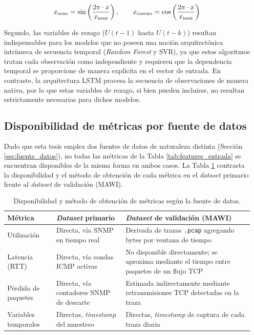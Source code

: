 \documentclass[12pt]{report}
\begin{document}
\begin{equation}
    x_{\mbox{\scriptsize seno}} = \sin\left(\frac{2\pi \cdot x}{x_{\max}}\right), \qquad x_{\mbox{\scriptsize coseno}} = \cos\left(\frac{2\pi \cdot x}{x_{\max}}\right)
    \label{eq:codificacion_ciclica}
\end{equation}

Segundo, las variables de rezago ($U(t-1)$ hasta $U(t-k)$) resultan indispensables para los modelos que no poseen una noción arquitectónica intrínseca de secuencia temporal (\textit{Random Forest} y SVR), ya que estos algoritmos tratan cada observación como independiente y requieren que la dependencia temporal se proporcione de manera explícita en el vector de entrada. En contraste, la arquitectura LSTM procesa la secuencia de observaciones de manera nativa, por lo que estas variables de rezago, si bien pueden incluirse, no resultan estrictamente 
necesarias para dichos modelos.

\subsection*{Disponibilidad de métricas por fuente de datos}

Dado que esta tesis emplea dos fuentes de datos de naturaleza distinta (Sección \ref{sec:fuente_datos}), no todas las métricas de la Tabla \ref{tab:features_entrada} se encuentran disponibles de la misma forma en ambos casos. La Tabla \ref{tab:disponibilidad_metricas} contrasta la disponibilidad y el método de obtención de cada métrica en el \textit{dataset} primario frente al \textit{dataset} de validación (MAWI).

\begin{table}[H]
    \centering
    \begin{tabular}{|l|p{4.5cm}|p{4.5cm}|}
        \hline
        \textbf{Métrica} & \textbf{\textit{Dataset} primario} & \textbf{\textit{Dataset} de validación (MAWI)} \\
        \hline
        Utilización & Directa, vía SNMP en tiempo real & Derivada de trazas \texttt{.pcap} agregando bytes por ventana de tiempo \\
        \hline
        Latencia (RTT) & Directa, vía sondas ICMP activas & No disponible directamente; se aproxima mediante el tiempo entre paquetes de un flujo TCP \\
        \hline
        Pérdida de paquetes & Directa, vía contadores SNMP de descarte & Estimada indirectamente mediante retransmisiones TCP detectadas en la traza \\
        \hline
        Variables temporales & Directas, \textit{timestamp} del muestreo & Directas, \textit{timestamp} de captura de cada traza diaria \\
        \hline
    \end{tabular}
    \caption{Disponibilidad y método de obtención de métricas según la fuente de datos.}
    \label{tab:disponibilidad_metricas}
\end{table}
\end{document}
